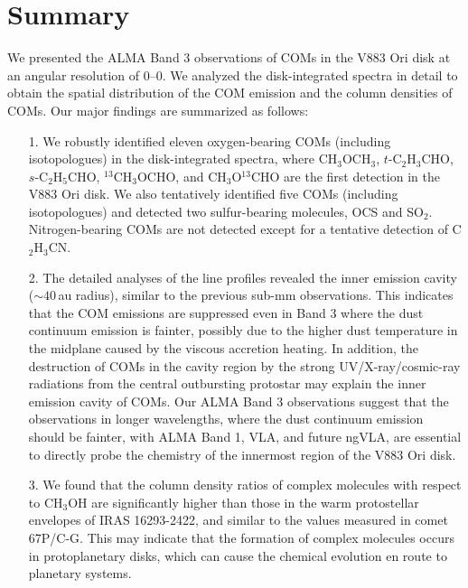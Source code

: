 \documentclass[linenumbers, twocolumn, twocolappendix, astrosymb, times]{aastex631}
\newcommand{\methanol}{CH$_3$OH\xspace}
\newcommand{\methylformate}{CH$_3$OCHO\xspace}
\newcommand{\dimethylether}{CH$_3$OCH$_3$\xspace}
\newcommand{\propenal}{$t$-C$_2$H$_3$CHO\xspace}
\newcommand{\propanal}{$s$-C$_2$H$_5$CHO\xspace}
\begin{document}
\section{Summary} \label{sec:summary}
We presented the ALMA Band 3 observations of COMs in the V883 Ori disk at an angular resolution of 0--0. We analyzed the disk-integrated spectra in detail to obtain the spatial distribution of the COM emission and the column densities of COMs. Our major findings are summarized as follows:
\begin{enumerate}
    \item[1.] We robustly identified eleven oxygen-bearing COMs (including isotopologues) in the disk-integrated spectra, where \dimethylether, \propenal, \propanal, $^{13}$\methylformate, and CH$_3$O$^{13}$CHO are the first detection in the V883 Ori disk. We also tentatively identified five COMs (including isotopologues) and detected two sulfur-bearing molecules, OCS and SO$_2$. Nitrogen-bearing COMs are not detected except for a tentative detection of C$_2$H$_3$CN.
    \item[2.] The detailed analyses of the line profiles revealed the inner emission cavity ($\sim40$\,au radius), similar to the previous sub-mm observations. This indicates that the COM emissions are suppressed even in Band 3 where the dust continuum emission is fainter, possibly due to the higher dust temperature in the midplane caused by the viscous accretion heating. In addition, the destruction of COMs in the cavity region by the strong UV/X-ray/cosmic-ray radiations from the central outbursting protostar may explain the inner emission cavity of COMs.  Our ALMA Band 3 observations suggest that the observations in longer wavelengths, where the dust continuum emission should be fainter, with ALMA Band 1, VLA, and future ngVLA, are essential to directly probe the chemistry of the innermost region of the V883 Ori disk.
    
    \item[3.] We found that the column density ratios of complex molecules with respect to \methanol are significantly higher than those in the warm protostellar envelopes of IRAS 16293-2422, and similar to the values measured in comet 67P/C-G. This may indicate that the formation of complex molecules occurs in protoplanetary disks, which can cause the chemical evolution en route to planetary systems.
    

\end{enumerate}
\end{document}
